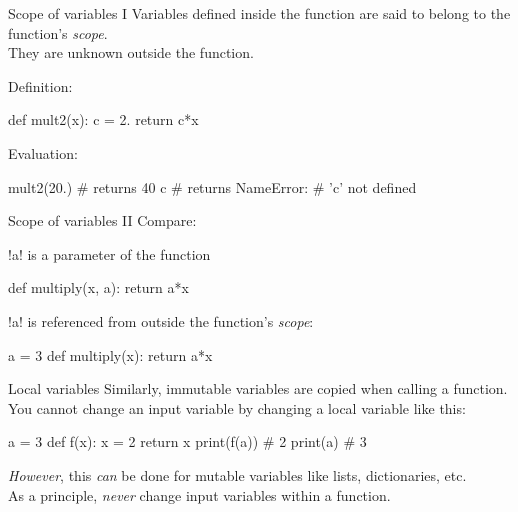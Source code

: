 \documentclass[hyperref={pdfpagelabels=false},table]{beamer}
\begin{document}
\begin{frame}[fragile]{Scope of variables I}
Variables defined inside the function
are said to belong to the function's \emph{scope}.\\

They are unknown outside the function.
\vfill
\begin{minipage}[top]{0.3\textwidth}
Definition:
\begin{python}
def mult2(x):
    c = 2.
    return c*x
\end{python}
\end{minipage}
\hfill
\begin{minipage}[top]{0.6\textwidth}
Evaluation:
\begin{python}
mult2(20.)  # returns 40
c    # returns NameError:
     # 'c' not defined
\end{python}
\end{minipage}
\end{frame}
\begin{frame}[fragile]{Scope of variables II}
Compare:\\
\vfill
\begin{minipage}[top]{0.4\textwidth}
\pyth!a! is a parameter of the function
\begin{python}
def multiply(x, a):
    return a*x
\end{python}
\end{minipage}
\hfill
\begin{minipage}[top]{0.4\textwidth}
\pyth!a! is referenced from outside the function's \emph{scope}:
\begin{python}
a = 3
def multiply(x):
    return a*x
\end{python}
\end{minipage}
\end{frame}
\begin{frame}[fragile]{Local variables}
Similarly, immutable variables are copied when calling a function.\\
You cannot change an input variable by changing a local variable like this:
\begin{python}
a = 3
def f(x):
    x = 2
    return x
print(f(a)) # 2
print(a)    # 3
\end{python}
\emph{However}, this \emph{can} be done for mutable variables like lists, dictionaries, etc.\\
As a principle, \emph{never} change input variables within a function.
\end{frame}
\end{document}
